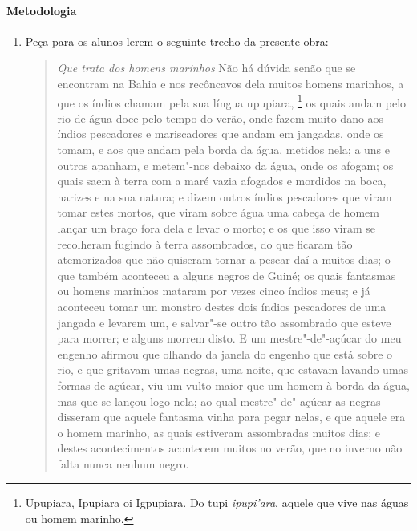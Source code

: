 \documentclass[12pt]{extarticle}
\begin{document}
{\paragraph{Metodologia}

\begin{enumerate}

\item Peça para os alunos lerem o seguinte trecho da presente obra:

\begin{quote} 
\emph{Que trata dos homens marinhos}
Não há dúvida senão que se encontram na Bahia e nos recôncavos dela 
muitos homens marinhos, a que os índios chamam pela sua língua upupiara,
\footnote{Upupiara, Ipupiara oi Igpupiara. Do tupi \textit{îpupi'ara}, 
aquele que vive nas águas ou homem marinho.} os quais andam pelo rio de 
água doce pelo tempo do verão, onde fazem muito dano aos índios
pescadores e mariscadores que andam em jangadas, onde os tomam, e aos que 
andam pela borda da água, metidos nela; a uns e outros apanham, e metem"-nos 
debaixo da água, onde os afogam; os quais saem à terra com a maré vazia 
afogados e mordidos na boca, narizes e na sua natura; e dizem outros índios pescadores que viram tomar estes mortos, que viram sobre água uma cabeça 
de homem lançar um braço fora dela e levar o morto; e os que isso viram 
se recolheram fugindo à terra assombrados, do que ficaram tão atemorizados 
que não quiseram tornar a pescar daí a muitos dias; o que também aconteceu 
a alguns negros de Guiné; os quais fantasmas ou homens marinhos mataram 
por vezes cinco índios meus; e já aconteceu tomar um monstro destes dois 
índios pescadores de uma jangada e levarem um, e salvar"-se outro tão 
assombrado que esteve para morrer; e alguns morrem disto. E um 
mestre"-de"-açúcar do meu engenho afirmou que olhando da janela do engenho 
que está sobre o rio, e que gritavam umas negras, uma noite, que estavam 
lavando umas formas de açúcar, viu um vulto maior que um homem à borda da 
água, mas que se lançou logo nela; ao qual mestre"-de"-açúcar as negras 
disseram que aquele fantasma vinha para pegar nelas, e que aquele era o 
homem marinho, as quais estiveram assombradas muitos dias; e destes 
acontecimentos acontecem muitos no verão, que no inverno não falta nunca 
nenhum negro.
\end{quote}


\end{enumerate}}
\end{document}
